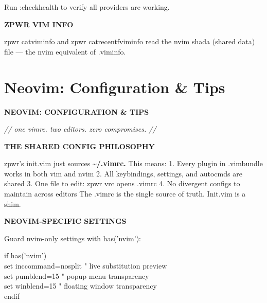 \documentclass[11pt,a4paper,twoside]{book}
\begin{document}
Run :checkhealth to verify all providers are working.


\vspace{12pt}
{\bfseries\color{neonyellow} \textbf{ZPWR} VIM INFO}\vspace{4pt}

zpwr catviminfo and zpwr catrecentfviminfo read the nvim shada (shared data) file — the nvim equivalent of .viminfo.


\vspace{16pt}

\section{Neovim: Configuration \& Tips}


\vspace{10pt}
{\large\bfseries\color{neoncyan} NEOVIM: CONFIGURATION \& TIPS}\vspace{6pt}

{\small\itshape\color{dimtext} // one vimrc. two editors. zero compromises. //}


\vspace{12pt}
{\bfseries\color{neonyellow} THE SHARED CONFIG PHILOSOPHY}\vspace{4pt}

zpwr's init.vim just sources \textbf{\textasciitilde{}/.vimrc.} This means: 1. Every plugin in .vimbundle works in both vim and nvim 2. All keybindings, settings, and autocmds are shared 3. One file to edit: zpwr vrc opens .vimrc 4. No divergent configs to maintain across editors The .vimrc is the single source of truth. Init.vim is a shim.


\vspace{12pt}
{\bfseries\color{neonyellow} NEOVIM-SPECIFIC SETTINGS}\vspace{4pt}

Guard nvim-only settings with has('nvim'):

\begin{codebox}
\color{neongreen}if has('nvim')\\
\color{neongreen}set inccommand=nosplit   " live substitution preview\\
\color{neongreen}set pumblend=15          " popup menu transparency\\
\color{neongreen}set winblend=15          " floating window transparency\\
\color{neongreen}endif\\
\end{codebox}
\end{document}
